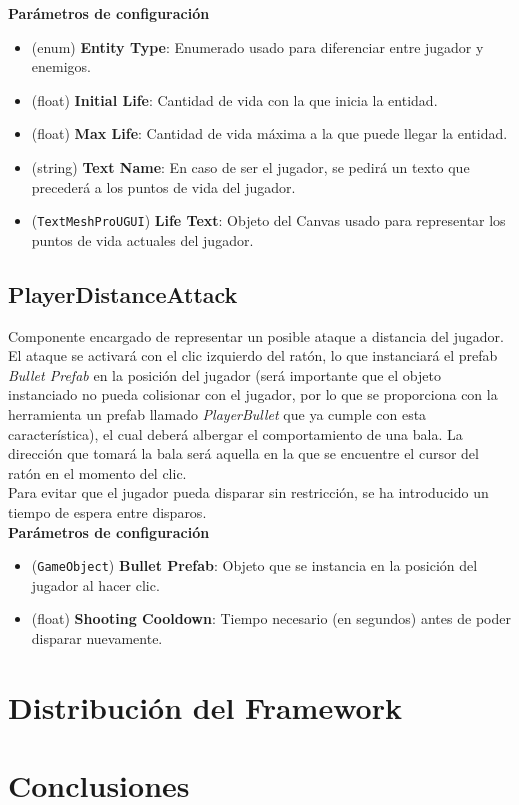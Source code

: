 \textbf{Parámetros de configuración}
\begin{itemize}
	\item (enum) \textbf{Entity Type}: Enumerado usado para diferenciar entre jugador y enemigos.
	\item (float) \textbf{Initial Life}: Cantidad de vida con la que inicia la entidad.
	\item (float) \textbf{Max Life}: Cantidad de vida máxima a la que puede llegar la entidad.
	\item (string) \textbf{Text Name}: En caso de ser el jugador, se pedirá un texto que precederá a los puntos de vida del jugador.
	\item (\texttt{TextMeshProUGUI}) \textbf{Life Text}: Objeto del Canvas usado para representar los puntos de vida actuales del jugador.
\end{itemize}

\subsection{PlayerDistanceAttack}

Componente encargado de representar un posible ataque a distancia del jugador. El ataque se activará con el clic izquierdo del ratón, lo que instanciará el prefab \textit{Bullet Prefab} en la posición del jugador (será importante que el objeto instanciado no pueda colisionar con el jugador, por lo que se proporciona con la herramienta un prefab llamado \textit{PlayerBullet} que ya cumple con esta característica), el cual deberá albergar el comportamiento de una bala. La dirección que tomará la bala será aquella en la que se encuentre el cursor del ratón en el momento del clic.\\

Para evitar que el jugador pueda disparar sin restricción, se ha introducido un tiempo de espera entre disparos.\\

\textbf{Parámetros de configuración}
\begin{itemize}
	\item (\texttt{GameObject}) \textbf{Bullet Prefab}: Objeto que se instancia en la posición del jugador al hacer clic.
	\item (float) \textbf{Shooting Cooldown}: Tiempo necesario (en segundos) antes de poder disparar nuevamente.
\end{itemize}

\section {Distribución del Framework}
\section {Conclusiones}

